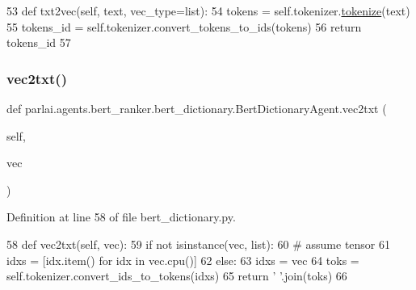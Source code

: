 \begin{DoxyCode}
53     \textcolor{keyword}{def }txt2vec(self, text, vec\_type=list):
54         tokens = self.tokenizer.\hyperlink{namespaceparlai_1_1agents_1_1tfidf__retriever_1_1build__tfidf_a1fdb457e98eb4e4c26047e229686a616}{tokenize}(text)
55         tokens\_id = self.tokenizer.convert\_tokens\_to\_ids(tokens)
56         \textcolor{keywordflow}{return} tokens\_id
57 
\end{DoxyCode}
\mbox{\label{classparlai_1_1agents_1_1bert__ranker_1_1bert__dictionary_1_1BertDictionaryAgent_a6269b15dc01bfaac5dd1b5da995f2f0f}} 
\subsubsection{\texorpdfstring{vec2txt()}{vec2txt()}}
{\footnotesize\ttfamily def parlai.\+agents.\+bert\+\_\+ranker.\+bert\+\_\+dictionary.\+Bert\+Dictionary\+Agent.\+vec2txt (\begin{DoxyParamCaption}\item[{}]{self,  }\item[{}]{vec }\end{DoxyParamCaption})}



Definition at line 58 of file bert\+\_\+dictionary.\+py.


\begin{DoxyCode}
58     \textcolor{keyword}{def }vec2txt(self, vec):
59         \textcolor{keywordflow}{if} \textcolor{keywordflow}{not} isinstance(vec, list):
60             \textcolor{comment}{# assume tensor}
61             idxs = [idx.item() \textcolor{keywordflow}{for} idx \textcolor{keywordflow}{in} vec.cpu()]
62         \textcolor{keywordflow}{else}:
63             idxs = vec
64         toks = self.tokenizer.convert\_ids\_to\_tokens(idxs)
65         \textcolor{keywordflow}{return} \textcolor{stringliteral}{' '}.join(toks)
66 
\end{DoxyCode}


